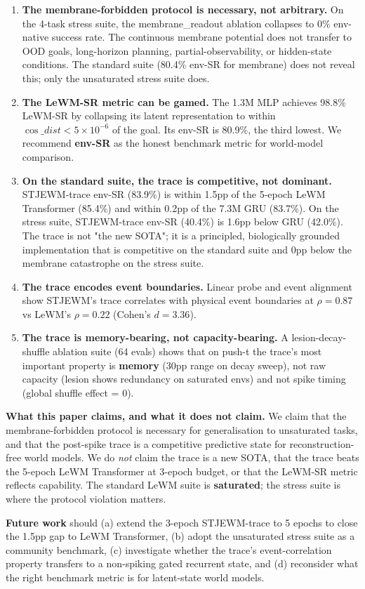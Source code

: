 \documentclass{article}
\begin{document}
\begin{enumerate}
\item \textbf{The membrane-forbidden protocol is necessary, not arbitrary.}
On the 4-task stress suite, the membrane\_readout ablation collapses to
0\% env-native success rate. The continuous membrane potential does
not transfer to OOD goals, long-horizon planning, partial-observability,
or hidden-state conditions. The standard suite (80.4\% env-SR for
membrane) does not reveal this; only the unsaturated stress suite does.

\item \textbf{The LeWM-SR metric can be gamed.} The 1.3M MLP achieves
98.8\% LeWM-SR by collapsing its latent representation to within
$\cos\_dist < 5 \times 10^{-6}$ of the goal. Its env-SR is 80.9\%,
the third lowest. We recommend \textbf{env-SR} as the honest benchmark
metric for world-model comparison.

\item \textbf{On the standard suite, the trace is competitive, not
dominant.} STJEWM-trace env-SR (83.9\%) is within 1.5pp of the 5-epoch
LeWM Transformer (85.4\%) and within 0.2pp of the 7.3M GRU (83.7\%).
On the stress suite, STJEWM-trace env-SR (40.4\%) is 1.6pp below GRU
(42.0\%). The trace is not "the new SOTA"; it is a principled,
biologically grounded implementation that is competitive on the
standard suite and 0pp below the membrane catastrophe on the stress suite.

\item \textbf{The trace encodes event boundaries.} Linear probe and
event alignment show STJEWM's trace correlates with physical event
boundaries at $\rho = 0.87$ vs LeWM's $\rho = 0.22$ (Cohen's $d = 3.36$).

\item \textbf{The trace is memory-bearing, not capacity-bearing.} A
lesion-decay-shuffle ablation suite (64 evals) shows that on push-t
the trace's most important property is \textbf{memory} (30pp range on
decay sweep), not raw capacity (lesion shows redundancy on saturated
envs) and not spike timing (global shuffle effect = 0).
\end{enumerate}

\textbf{What this paper claims, and what it does not claim.} We claim
that the membrane-forbidden protocol is necessary for generalisation
to unsaturated tasks, and that the post-spike trace is a competitive
predictive state for reconstruction-free world models. We do
\emph{not} claim the trace is a new SOTA, that the trace beats the
5-epoch LeWM Transformer at 3-epoch budget, or that the LeWM-SR metric
reflects capability. The standard LeWM suite is \textbf{saturated};
the stress suite is where the protocol violation matters.

\textbf{Future work} should (a) extend the 3-epoch STJEWM-trace to 5
epochs to close the 1.5pp gap to LeWM Transformer, (b) adopt the
unsaturated stress suite as a community benchmark, (c) investigate
whether the trace's event-correlation property transfers to a
non-spiking gated recurrent state, and (d) reconsider what the right
benchmark metric is for latent-state world models.
\end{document}

